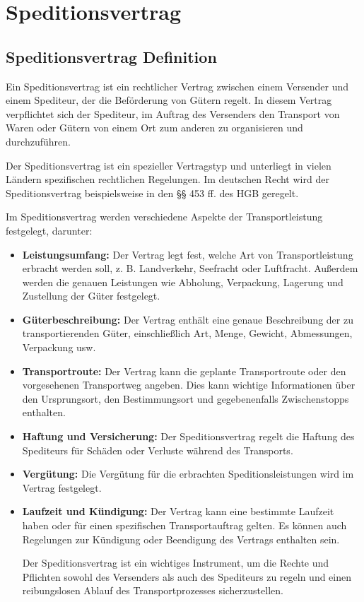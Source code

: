 
    \chapter[Speditionsvertrag]{Speditionsvertrag}

    \section{Speditionsvertrag Definition}

    Ein Speditionsvertrag ist ein rechtlicher Vertrag zwischen einem Versender  und einem Spediteur, der die Beförderung von Gütern regelt. In diesem Vertrag verpflichtet sich der Spediteur, im Auftrag des Versenders den Transport von Waren oder Gütern von einem Ort zum anderen zu organisieren und durchzuführen.

    Der Speditionsvertrag ist ein spezieller Vertragstyp und unterliegt in vielen Ländern spezifischen rechtlichen Regelungen. Im deutschen Recht wird der Speditionsvertrag beispielsweise in den §§ 453 ff. des HGB geregelt.

    Im Speditionsvertrag werden verschiedene Aspekte der Transportleistung festgelegt, darunter:
    \begin{itemize}
        \item \textbf{Leistungsumfang:} Der Vertrag legt fest, welche Art von Transportleistung erbracht werden soll, z. B. Landverkehr, Seefracht oder Luftfracht. Außerdem werden die genauen Leistungen wie Abholung, Verpackung, Lagerung und Zustellung der Güter festgelegt.
        \item \textbf{Güterbeschreibung:} Der Vertrag enthält eine genaue Beschreibung der zu transportierenden Güter, einschließlich Art, Menge, Gewicht, Abmessungen, Verpackung usw.
        \item \textbf{Transportroute:} Der Vertrag kann die geplante Transportroute oder den vorgesehenen Transportweg angeben. Dies kann wichtige Informationen über den Ursprungsort, den Bestimmungsort und gegebenenfalls Zwischenstopps enthalten.
        \item \textbf{Haftung und Versicherung:} Der Speditionsvertrag regelt die Haftung des Spediteurs für Schäden oder Verluste während des Transports.
        \item \textbf{Vergütung:} Die Vergütung für die erbrachten Speditionsleistungen wird im Vertrag festgelegt.
        \item \textbf{Laufzeit und Kündigung:} Der Vertrag kann eine bestimmte Laufzeit haben oder für einen spezifischen Transportauftrag gelten. Es können auch Regelungen zur Kündigung oder Beendigung des Vertrags enthalten sein.

    Der Speditionsvertrag ist ein wichtiges Instrument, um die Rechte und Pflichten sowohl des Versenders als auch des Spediteurs zu regeln und einen reibungslosen Ablauf des Transportprozesses sicherzustellen.
\end{itemize}
